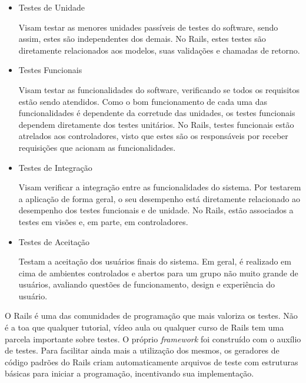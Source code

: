 \begin{itemize}
\item Testes de Unidade

Visam testar as menores unidades passíveis de testes do software, sendo assim, estes são independentes dos demais. No Rails, estes testes são diretamente relacionados aos modelos, suas validações e chamadas de retorno.

\item Testes Funcionais

Visam testar as funcionalidades do software, verificando se todos os requisitos estão sendo atendidos. Como o bom funcionamento de cada uma das funcionalidades é dependente da corretude das unidades, os testes funcionais dependem diretamente dos testes unitários. No Rails, testes funcionais estão atrelados aos controladores, visto que estes são os responsáveis por receber requisições que acionam as funcionalidades.

\item Testes de Integração

Visam verificar a integração entre as funcionalidades do sistema. Por testarem a aplicação de forma geral, o seu desempenho está diretamente relacionado ao desempenho dos testes funcionais e de unidade. No Rails, estão associados a testes em visões e, em parte, em controladores.

\item Testes de Aceitação

Testam a aceitação dos usuários finais do sistema. Em geral, é realizado em cima de ambientes controlados e abertos para um grupo não muito grande de usuários, avaliando questões de funcionamento, design e experiência do usuário.

\end{itemize}

O Rails é uma das comunidades de programação que mais valoriza os testes. Não é a toa que qualquer tutorial, vídeo aula ou qualquer curso de Rails tem uma parcela importante sobre testes. O próprio \textit{framework} foi construído com o auxílio de testes. Para facilitar ainda mais a utilização dos mesmos, os geradores de código padrões do Rails criam automaticamente arquivos de teste com estruturas básicas para iniciar a programação, incentivando sua implementação.

